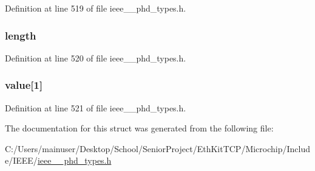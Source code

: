 Definition at line 519 of file ieee\+\_\+\_\+phd\+\_\+types.\+h.

\hypertarget{struct___data_proto_list_a3743679e4ff85e3e1b3fc2e59973fbb3}{}
\subsubsection[{length}]{ length}\label{struct___data_proto_list_a3743679e4ff85e3e1b3fc2e59973fbb3}


Definition at line 520 of file ieee\+\_\+\_\+phd\+\_\+types.\+h.

\hypertarget{struct___data_proto_list_a137c5e2482cc858ede4329b876618963}{}
\subsubsection[{value}]{ value\mbox{[}1\mbox{]}}\label{struct___data_proto_list_a137c5e2482cc858ede4329b876618963}


Definition at line 521 of file ieee\+\_\+\_\+phd\+\_\+types.\+h.



The documentation for this struct was generated from the following file\+:\begin{DoxyCompactItemize}
\item 
C\+:/\+Users/mainuser/\+Desktop/\+School/\+Senior\+Project/\+Eth\+Kit\+T\+C\+P/\+Microchip/\+Include/\+I\+E\+E\+E/\hyperlink{ieee__11073__phd__types_8h}{ieee\+\_\+\_\+phd\+\_\+types.\+h}\end{DoxyCompactItemize}
